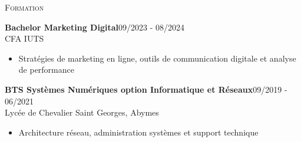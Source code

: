 \documentclass[11pt,a4paper]{article}
\newcommand{\headright}[1]{\vspace*{2.5ex}\textsc{\Large\color{cvblue}#1}\par%
  \vspace*{-2ex}{\color{cvblue}\hrulefill}\par}
\begin{document}
\begin{minipage}[t]{0.56\textwidth}
  \headright{Formation}
  \colorbox{maincolor}{%
  \begin{minipage}{\linewidth}
    \noindent
    \textbf{Bachelor Marketing Digital}\hfill 09/2023 - 08/2024\\
    CFA IUTS\\[-0.3em]
    \begin{itemize}[leftmargin=*]
      \item Stratégies de marketing en ligne, outils de communication digitale et analyse de performance
    \end{itemize}
  \end{minipage}}

\vspace{3mm}

\colorbox{maincolor}{%
  \begin{minipage}{\linewidth}
    \noindent
    \textbf{BTS Systèmes Numériques option Informatique et Réseaux}\hfill 09/2019 - 06/2021\\
    Lycée de Chevalier Saint Georges, Abymes\\[-0.3em]
    \begin{itemize}[leftmargin=*]
      \item Architecture réseau, administration systèmes et support technique
    \end{itemize}
  \end{minipage}}

\end{minipage}
\end{document}
